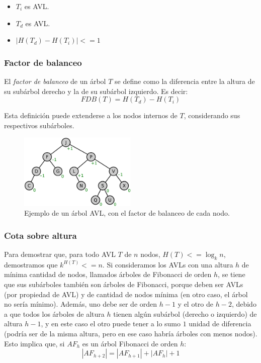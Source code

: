 \documentclass{article}
\begin{document}
\begin{itemize}
    \item $T_i$ es AVL.
    \item $T_d$ es AVL.
    \item $|H(T_d) - H(T_i)| <= 1$
\end{itemize}

\subsubsection{Factor de balanceo}

El \textit{factor de balanceo} de un árbol $T$ se define como la diferencia entre la altura de su subárbol derecho y la de su subárbol izquierdo. Es decir:
$$FDB(T) = H(T_d) - H(T_i)$$

Esta definición puede extenderse a los nodos internos de $T$, considerando sus respectivos subárboles.

\begin{figure}[H]
    \centering
    \includegraphics[width=0.5\textwidth]{AVL_tree.png}
    \caption*{Ejemplo de un árbol AVL, con el factor de balanceo de cada nodo.}
\end{figure}

\subsubsection{Cota sobre altura}

Para demostrar que, para todo AVL $T$ de $n$ nodos, $H(T) <= \log_k{n}$, demostramos que $k^{H(T)} <= n$. Si consideramos los AVLs con una altura $h$ de mínima cantidad de nodos, llamados árboles de Fibonacci de orden $h$, se tiene que sus subárboles también son árboles de Fibonacci, porque deben ser AVLs (por propiedad de AVL) y de cantidad de nodos mínima (en otro caso, el árbol no sería mínimo). Además, uno debe ser de orden $h - 1$ y el otro de $h - 2$, debido a que todos los árboles de altura $h$ tienen algún subárbol (derecho o izquierdo) de altura $h - 1$, y en este caso el otro puede tener a lo sumo $1$ unidad de diferencia (podría ser de la misma altura, pero en ese caso habría árboles con menos nodos). Esto implica que, si $AF_h$ es un árbol Fibonacci de orden $h$:
$$|AF_{h+2}| = |AF_{h+1}| + |AF_h| + 1$$
\end{document}
